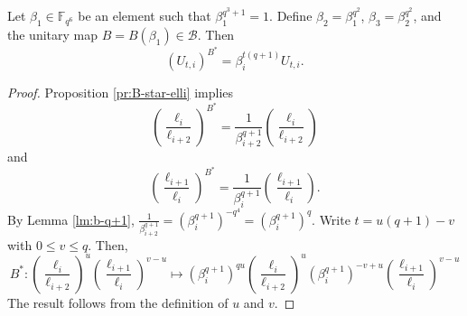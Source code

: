 \documentclass[entropy,article,submit,pdftex,moreauthors]{Definitions/mdpi}
\begin{document}
\begin{Lemma} \label{lm:B-start-on-U}
Let $\beta_1 \in \mathbb{F}_{q^6}$ be an element such that $\beta_1^{q^3+1}=1$. Define $\beta_2=\beta_1^{q^2}$, $\beta_3=\beta_2^{q^2}$, and the unitary map $B=B(\beta_1) \in \mathcal{B}$. Then
\[(U_{t,i})^{B^*} = \beta_i^{t(q+1)} U_{t,i}.\]
\end{Lemma}
\begin{proof}
Proposition \ref{pr:B-star-elli} implies
\[\left(\frac{\ell_i}{\ell_{i+2}}\right)^{B^*} = \frac{1}{\beta_{i+2}^{q+1}}\left(\frac{\ell_i}{\ell_{i+2}}\right)\]
and
\[\left(\frac{\ell_{i+1}}{\ell_{i}}\right)^{B^*} = \frac{1}{\beta_{i}^{q+1}}
\left(\frac{\ell_{i+1}}{\ell_{i}}\right).\]
By Lemma \ref{lm:b-q+1}, $\frac{1}{\beta_{i+2}^{q+1}} = (\beta_{i}^{q+1})^{-q^4} = (\beta_{i}^{q+1})^{q}$. Write $t=u(q+1)-v$ with $0\leq v\leq q$. Then, 
\[B^*: \left(\frac{\ell_i}{\ell_{i+2}}\right)^u\left(\frac{\ell_{i+1}}{\ell_i}\right)^{v-u} \mapsto (\beta_i^{q+1})^{qu}  \left(\frac{\ell_i}{\ell_{i+2}}\right)^u (\beta_{i}^{q+1})^{-v+u} \left(\frac{\ell_{i+1}}{\ell_i}\right)^{v-u}\]
The result follows from the definition of $u$ and $v$. 
\end{proof}
\end{document}
